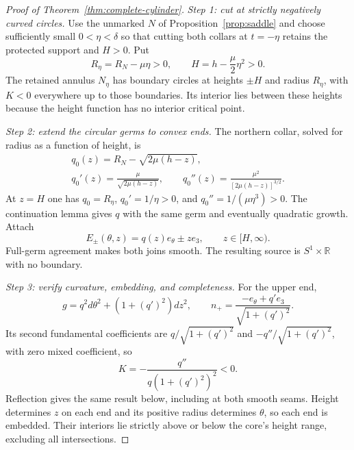 \documentclass[11pt]{amsart}
\theoremstyle{definition}
\theoremstyle{remark}
\newcommand{\R}{\mathbb R}\newcommand{\Sph}{\mathbb S}
\numberwithin{equation}{section}
\begin{document}
\begin{proof}[Proof of Theorem~\ref{thm:complete-cylinder}]
\emph{Step 1: cut at strictly negatively curved circles.}
Use the unmarked $N$ of Proposition~\ref{prop:saddle} and choose sufficiently small $0<\eta<\delta$ so that cutting both
collars at $t=-\eta$ retains the protected support and $H>0$. Put
\begin{equation}\label{eq:complete-cut}
 R_\eta=R_N-\mu\eta>0,\qquad
 H=h-\frac\mu2\eta^2>0.
\end{equation}
The retained annulus $N_\eta$ has boundary circles at heights $\pm H$
and radius $R_\eta$, with $K<0$ everywhere up to those boundaries.
Its interior lies between these heights because the height function has
no interior critical point.

\emph{Step 2: extend the circular germs to convex ends.}
The northern collar, solved for radius as a function of height, is
\begin{equation}\label{eq:complete-collar}
 \begin{gathered}
 q_0(z)=R_N-\sqrt{2\mu(h-z)},\\
 q_0'(z)=\frac{\mu}{\sqrt{2\mu(h-z)}},\qquad
 q_0''(z)=\frac{\mu^2}{[2\mu(h-z)]^{3/2}}.
 \end{gathered}
\end{equation}
At $z=H$ one has $q_0=R_\eta$, $q_0'=1/\eta>0$, and
$q_0''=1/(\mu\eta^3)>0$.
The continuation lemma gives $q$ with the same germ and eventually
quadratic growth. Attach
\begin{equation}\label{eq:complete-ends}
 E_\pm(\theta,z)=q(z)e_\theta\pm ze_3,
 \qquad z\in[H,\infty).
\end{equation}
Full-germ agreement makes both joins smooth. The resulting source is
$S^1\times\R$ with no boundary.

\emph{Step 3: verify curvature, embedding, and completeness.}
For the upper end,
\begin{equation}\label{eq:complete-end-metric}
 g=q^2d\theta^2+(1+(q')^2)dz^2,\qquad
 n_+=\frac{-e_\theta+q'e_3}{\sqrt{1+(q')^2}}.
\end{equation}
Its second fundamental coefficients are $q/\sqrt{1+(q')^2}$ and
$-q''/\sqrt{1+(q')^2}$, with zero mixed coefficient, so
\begin{equation}\label{eq:complete-end-curvature}
 K=-\frac{q''}{q(1+(q')^2)^2}<0.
\end{equation}
Reflection gives the same result below, including at both smooth seams.
Height determines $z$ on each end and its positive radius determines
$\theta$, so each end is embedded. Their interiors lie strictly above
or below the core's height range, excluding all intersections.


\end{proof}
\end{document}
